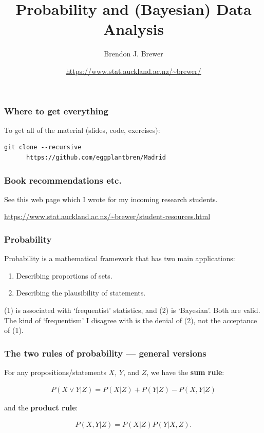 \documentclass{beamer}
\title{Probability and (Bayesian) Data Analysis}
\author{Brendon J. Brewer}
\institute{Department of Statistics\\
The University of Auckland}
\date{\color{blue}\url{https://www.stat.auckland.ac.nz/~brewer/}}
\begin{document}
\frame{\titlepage}


\begin{frame}[t, fragile]
\frametitle{Where to get everything}

To get all of the material (slides, code, exercises):\vspace{1em}

\begin{center}
\begin{verbatim}
git clone --recursive
      https://github.com/eggplantbren/Madrid
\end{verbatim}
\end{center}

\end{frame}


\begin{frame}[t, fragile]
\frametitle{Book recommendations etc.}

See this web page which I wrote for my incoming research students.\vspace{1em}

{\color{blue}\url{https://www.stat.auckland.ac.nz/~brewer/student-resources.html}}

\end{frame}



\begin{frame}
\frametitle{Probability}

Probability is a mathematical framework that has two main applications:
\vspace{0.5em}
\begin{enumerate}
  \item[(1)] Describing proportions of sets.
  \item[(2)] Describing the plausibility of statements.
\end{enumerate}
\vspace{1em}
(1) is associated with `frequentist' statistics, and (2) is `Bayesian'.
Both are valid. The kind of `frequentism' I disagree with is the denial
of (2), not the acceptance of (1).

\end{frame}


\begin{frame}
\frametitle{The two rules of probability --- general versions}
For any propositions/statements $X$, $Y$, and $Z$, we have
the {\bf sum rule}:

\begin{align}
P(X \vee Y | Z) = P(X | Z) + P(Y | Z) - P(X, Y | Z)
\end{align}

and the {\bf product rule}:

\begin{align}
P(X, Y | Z) = P(X | Z)P(Y | X, Z).
\end{align}

\end{frame}
\end{document}
